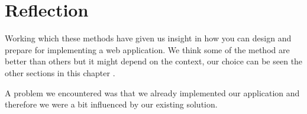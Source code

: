 \section{Reflection}
Working which these methods have given us insight in how you can design and prepare for implementing a web application. We think some of the method are better than others but it might depend on the context, our choice can be seen the other sections in this chapter .

A problem we encountered was that we already implemented our application and therefore we were a bit influenced by our existing solution.